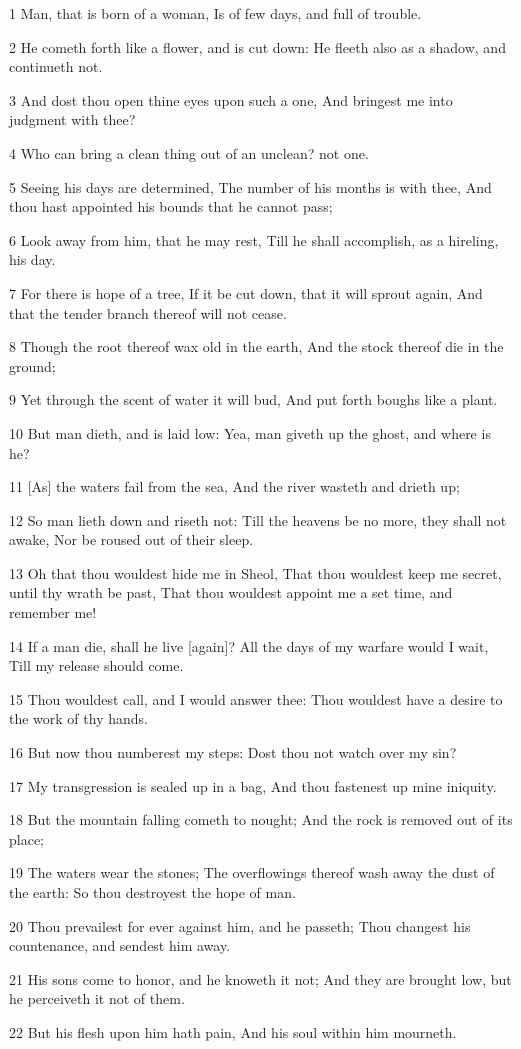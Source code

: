 \par 1 Man, that is born of a woman, Is of few days, and full of trouble.
\par 2 He cometh forth like a flower, and is cut down: He fleeth also as a shadow, and continueth not.
\par 3 And dost thou open thine eyes upon such a one, And bringest me into judgment with thee?
\par 4 Who can bring a clean thing out of an unclean? not one.
\par 5 Seeing his days are determined, The number of his months is with thee, And thou hast appointed his bounds that he cannot pass;
\par 6 Look away from him, that he may rest, Till he shall accomplish, as a hireling, his day.
\par 7 For there is hope of a tree, If it be cut down, that it will sprout again, And that the tender branch thereof will not cease.
\par 8 Though the root thereof wax old in the earth, And the stock thereof die in the ground;
\par 9 Yet through the scent of water it will bud, And put forth boughs like a plant.
\par 10 But man dieth, and is laid low: Yea, man giveth up the ghost, and where is he?
\par 11 [As] the waters fail from the sea, And the river wasteth and drieth up;
\par 12 So man lieth down and riseth not: Till the heavens be no more, they shall not awake, Nor be roused out of their sleep.
\par 13 Oh that thou wouldest hide me in Sheol, That thou wouldest keep me secret, until thy wrath be past, That thou wouldest appoint me a set time, and remember me!
\par 14 If a man die, shall he live [again]? All the days of my warfare would I wait, Till my release should come.
\par 15 Thou wouldest call, and I would answer thee: Thou wouldest have a desire to the work of thy hands.
\par 16 But now thou numberest my steps: Dost thou not watch over my sin?
\par 17 My transgression is sealed up in a bag, And thou fastenest up mine iniquity.
\par 18 But the mountain falling cometh to nought; And the rock is removed out of its place;
\par 19 The waters wear the stones; The overflowings thereof wash away the dust of the earth: So thou destroyest the hope of man.
\par 20 Thou prevailest for ever against him, and he passeth; Thou changest his countenance, and sendest him away.
\par 21 His sons come to honor, and he knoweth it not; And they are brought low, but he perceiveth it not of them.
\par 22 But his flesh upon him hath pain, And his soul within him mourneth.

